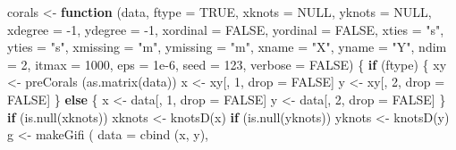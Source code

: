 \documentclass[
  12pt,
]{book}
\newenvironment{Shaded}{\begin{snugshade}}{\end{snugshade}}
\newcommand{\AttributeTok}[1]{\textcolor[rgb]{0.77,0.63,0.00}{#1}}
\newcommand{\ConstantTok}[1]{\textcolor[rgb]{0.00,0.00,0.00}{#1}}
\newcommand{\ControlFlowTok}[1]{\textcolor[rgb]{0.13,0.29,0.53}{\textbf{#1}}}
\newcommand{\DecValTok}[1]{\textcolor[rgb]{0.00,0.00,0.81}{#1}}
\newcommand{\FloatTok}[1]{\textcolor[rgb]{0.00,0.00,0.81}{#1}}
\newcommand{\FunctionTok}[1]{\textcolor[rgb]{0.00,0.00,0.00}{#1}}
\newcommand{\NormalTok}[1]{#1}
\newcommand{\OtherTok}[1]{\textcolor[rgb]{0.56,0.35,0.01}{#1}}
\newcommand{\SpecialCharTok}[1]{\textcolor[rgb]{0.00,0.00,0.00}{#1}}
\newcommand{\StringTok}[1]{\textcolor[rgb]{0.31,0.60,0.02}{#1}}
\begin{document}
\begin{Shaded}
\begin{Highlighting}[]
\NormalTok{corals }\OtherTok{\textless{}{-}}
  \ControlFlowTok{function}\NormalTok{ (data,}
            \AttributeTok{ftype =} \ConstantTok{TRUE}\NormalTok{,}
            \AttributeTok{xknots =} \ConstantTok{NULL}\NormalTok{,}
            \AttributeTok{yknots =} \ConstantTok{NULL}\NormalTok{,}
            \AttributeTok{xdegree =} \SpecialCharTok{{-}}\DecValTok{1}\NormalTok{,}
            \AttributeTok{ydegree =} \SpecialCharTok{{-}}\DecValTok{1}\NormalTok{,}
            \AttributeTok{xordinal =} \ConstantTok{FALSE}\NormalTok{,}
            \AttributeTok{yordinal =} \ConstantTok{FALSE}\NormalTok{,}
            \AttributeTok{xties =} \StringTok{"s"}\NormalTok{,}
            \AttributeTok{yties =} \StringTok{"s"}\NormalTok{,}
            \AttributeTok{xmissing =} \StringTok{"m"}\NormalTok{,}
            \AttributeTok{ymissing =} \StringTok{"m"}\NormalTok{,}
            \AttributeTok{xname =} \StringTok{"X"}\NormalTok{,}
            \AttributeTok{yname =} \StringTok{"Y"}\NormalTok{,}
            \AttributeTok{ndim =} \DecValTok{2}\NormalTok{,}
            \AttributeTok{itmax =} \DecValTok{1000}\NormalTok{,}
            \AttributeTok{eps =} \FloatTok{1e{-}6}\NormalTok{,}
            \AttributeTok{seed =} \DecValTok{123}\NormalTok{,}
            \AttributeTok{verbose =} \ConstantTok{FALSE}\NormalTok{) \{}
    \ControlFlowTok{if}\NormalTok{ (ftype) \{}
\NormalTok{      xy }\OtherTok{\textless{}{-}} \FunctionTok{preCorals}\NormalTok{ (}\FunctionTok{as.matrix}\NormalTok{(data))}
\NormalTok{      x }\OtherTok{\textless{}{-}}\NormalTok{ xy[, }\DecValTok{1}\NormalTok{, drop }\OtherTok{=} \ConstantTok{FALSE}\NormalTok{]}
\NormalTok{      y }\OtherTok{\textless{}{-}}\NormalTok{ xy[, }\DecValTok{2}\NormalTok{, drop }\OtherTok{=} \ConstantTok{FALSE}\NormalTok{]}
\NormalTok{    \} }\ControlFlowTok{else}\NormalTok{ \{}
\NormalTok{      x }\OtherTok{\textless{}{-}}\NormalTok{ data[, }\DecValTok{1}\NormalTok{, drop }\OtherTok{=} \ConstantTok{FALSE}\NormalTok{]}
\NormalTok{      y }\OtherTok{\textless{}{-}}\NormalTok{ data[, }\DecValTok{2}\NormalTok{, drop }\OtherTok{=} \ConstantTok{FALSE}\NormalTok{]}
\NormalTok{    \}}
    \ControlFlowTok{if}\NormalTok{ (}\FunctionTok{is.null}\NormalTok{(xknots))}
\NormalTok{      xknots }\OtherTok{\textless{}{-}} \FunctionTok{knotsD}\NormalTok{(x)}
    \ControlFlowTok{if}\NormalTok{ (}\FunctionTok{is.null}\NormalTok{(yknots))}
\NormalTok{      yknots }\OtherTok{\textless{}{-}} \FunctionTok{knotsD}\NormalTok{(y)}
\NormalTok{    g }\OtherTok{\textless{}{-}} \FunctionTok{makeGifi}\NormalTok{ (}
      \AttributeTok{data =} \FunctionTok{cbind}\NormalTok{ (x, y),}

\end{Highlighting}
\end{Shaded}
\end{document}
